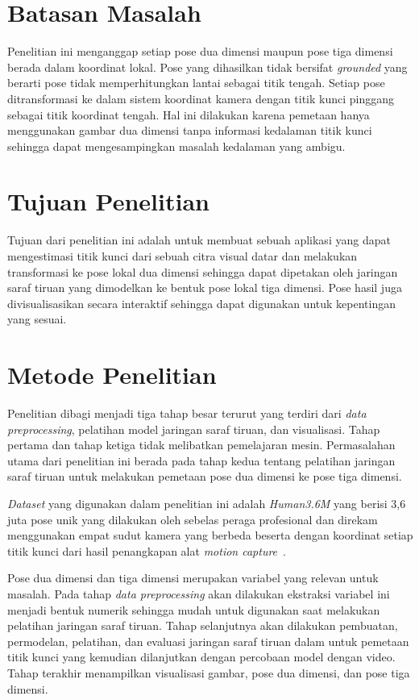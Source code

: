 \section{Batasan Masalah}
\label{sec:1-BatasMasalah}

Penelitian ini menganggap setiap pose dua dimensi maupun pose tiga dimensi berada dalam koordinat
lokal.
Pose yang dihasilkan tidak bersifat \textit{grounded} yang berarti pose tidak memperhitungkan lantai
sebagai titik tengah.
Setiap pose ditransformasi ke dalam sistem koordinat kamera dengan titik kunci pinggang
sebagai titik koordinat tengah. Hal ini dilakukan karena pemetaan hanya menggunakan gambar dua dimensi
tanpa informasi kedalaman titik kunci sehingga dapat mengesampingkan masalah kedalaman yang ambigu.

\section{Tujuan Penelitian}
\label{sec:1-TujuanPenelitian}

Tujuan dari penelitian ini adalah untuk membuat sebuah aplikasi yang dapat mengestimasi titik kunci dari
sebuah citra visual datar dan melakukan transformasi ke pose lokal dua dimensi sehingga dapat
dipetakan oleh jaringan saraf tiruan yang dimodelkan ke bentuk pose lokal tiga dimensi. Pose hasil
juga divisualisasikan secara interaktif sehingga dapat digunakan untuk kepentingan yang sesuai.

\section{Metode Penelitian}
\label{sec:1-MetodePenelitian}

Penelitian dibagi menjadi tiga tahap besar terurut yang terdiri dari \textit{data preprocessing},
pelatihan model jaringan saraf tiruan, dan visualisasi. Tahap pertama dan tahap ketiga tidak
melibatkan pemelajaran mesin. Permasalahan utama dari penelitian ini berada pada tahap kedua tentang
pelatihan jaringan saraf tiruan untuk melakukan pemetaan pose dua dimensi ke pose tiga dimensi.

\textit{Dataset} yang digunakan dalam penelitian ini adalah \textit{Human3.6M} yang berisi 3,6 juta
pose unik yang dilakukan oleh sebelas peraga profesional dan direkam menggunakan empat sudut kamera
yang berbeda beserta dengan koordinat setiap titik kunci dari hasil penangkapan alat
\textit{motion capture}~\cite{h36m_pami}.

Pose dua dimensi dan tiga dimensi merupakan variabel yang relevan untuk masalah. Pada tahap
\textit{data preprocessing} akan dilakukan ekstraksi variabel ini menjadi bentuk numerik sehingga
mudah untuk digunakan saat melakukan pelatihan jaringan saraf tiruan. Tahap selanjutnya akan
dilakukan pembuatan, permodelan, pelatihan, dan evaluasi jaringan saraf tiruan dalam untuk
pemetaan titik kunci yang kemudian dilanjutkan dengan percobaan model dengan video. Tahap terakhir
menampilkan visualisasi gambar, pose dua dimensi, dan pose tiga dimensi.

